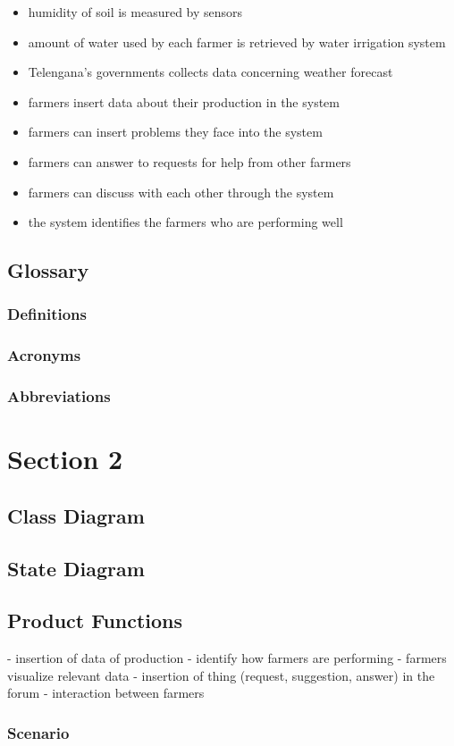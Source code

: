 \documentclass{article}
\begin{document}
\begin{itemize}
    \item humidity of soil is measured by sensors 
    \item amount of water used by each farmer is retrieved by water irrigation system
    \item Telengana's governments collects data concerning weather forecast
    \item farmers insert data about their production in the system
    \item farmers can insert problems they face into the system
    \item farmers can answer to requests for help from other farmers
    \item farmers can discuss with each other through the system
    \item the system identifies the farmers who are performing well
\end{itemize}

\subsection{Glossary}
\subsubsection{Definitions}
\subsubsection{Acronyms}
\subsubsection{Abbreviations}






\section{Section 2}
\subsection{Class Diagram}
\subsection{State Diagram}
\subsection{Product Functions}
- insertion of data of production
- identify how farmers are performing
- farmers visualize relevant data 
- insertion of thing (request, suggestion, answer) in the forum
- interaction between farmers

\subsubsection{Scenario}
\end{document}
